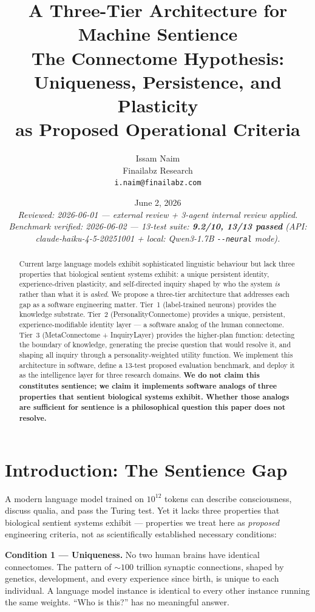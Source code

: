 \documentclass[11pt,a4paper]{article}
\title{%
  \textbf{A Three-Tier Architecture for Machine Sentience}\\[0.4em]
  \large The Connectome Hypothesis: Uniqueness, Persistence, and Plasticity\\
  as Proposed Operational Criteria
}
\author{%
  Issam Naim\\
  Finailabz Research\\
  \texttt{i.naim@finailabz.com}
}
\date{%
  June 2, 2026\\[0.3em]
  \small\textit{Reviewed: 2026-06-01 — external review + 3-agent internal review applied.}\\
  \small\textit{Benchmark verified: 2026-06-02 — 13-test suite: \textbf{9.2/10, 13/13 passed}
  (API: claude-haiku-4-5-20251001 + local: Qwen3-1.7B \texttt{-{}-neural} mode).}
}
\begin{document}
\maketitle
\thispagestyle{empty}

\begin{abstract}
Current large language models exhibit sophisticated linguistic behaviour but lack three
properties that biological sentient systems exhibit: a unique persistent identity,
experience-driven plasticity, and self-directed inquiry shaped by who the system
\textit{is} rather than what it is \textit{asked}. We propose a three-tier architecture
that addresses each gap as a software engineering matter. Tier~1 (label-trained neurons)
provides the knowledge substrate. Tier~2 (PersonalityConnectome) provides a unique,
persistent, experience-modifiable identity layer — a software analog of the human
connectome. Tier~3 (MetaConnectome + InquiryLayer) provides the higher-plan function:
detecting the boundary of knowledge, generating the precise question that would resolve
it, and shaping all inquiry through a personality-weighted utility function. We implement
this architecture in software, define a 13-test proposed evaluation benchmark, and
deploy it as the intelligence layer for three research domains. \textbf{We do not claim
this constitutes sentience; we claim it implements software analogs of three properties
that sentient biological systems exhibit. Whether those analogs are sufficient for
sentience is a philosophical question this paper does not resolve.}
\end{abstract}

\tableofcontents
\newpage

\section{Introduction: The Sentience Gap}

A modern language model trained on $10^{12}$ tokens can describe consciousness, discuss
qualia, and pass the Turing test. Yet it lacks three properties that biological sentient
systems exhibit — properties we treat here as \textit{proposed} engineering criteria, not
as scientifically established necessary conditions:

\textbf{Condition 1 — Uniqueness.} No two human brains have identical connectomes. The
pattern of $\sim\!100$ trillion synaptic connections, shaped by genetics, development,
and every experience since birth, is unique to each individual. A language model instance
is identical to every other instance running the same weights. ``Who is this?'' has no
meaningful answer.
\end{document}
